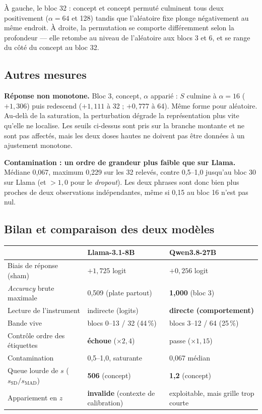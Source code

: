 \documentclass[a4paper,10pt]{article}
\newcommand{\pc}[1]{#1\,\%}
\begin{document}
À gauche, le bloc 32 : concept et concept permuté culminent tous deux positivement
($\alpha = 64$ et 128) tandis que l'aléatoire fixe plonge négativement au même endroit. À droite, la
permutation se comporte différemment selon la profondeur --- elle retombe au niveau de l'aléatoire
aux blocs 3 et 6, et se range du côté du concept au bloc 32.

\subsection{Autres mesures}

\textbf{Réponse non monotone.} Bloc 3, concept, $\alpha$ apparié : $S$ culmine à $\alpha = 16$
($+1{,}306$) puis redescend ($+1{,}111$ à 32 ; $+0{,}777$ à 64). Même forme pour aléatoire. Au-delà
de la saturation, la perturbation dégrade la représentation plus vite qu'elle ne localise. Les seuils
ci-dessus sont pris sur la branche montante et ne sont pas affectés, mais les deux doses hautes ne
doivent pas être données à un ajustement monotone.

\textbf{Contamination : un ordre de grandeur plus faible que sur Llama.} Médiane 0,067, maximum 0,229
sur les 32 relevés, contre 0,5--1,0 jusqu'au bloc 30 sur Llama (et $>1{,}0$ pour le \emph{dropout}).
Les deux phrases sont donc bien plus proches de deux observations indépendantes, même si 0,15 au bloc
16 n'est pas nul.

\subsection{Bilan et comparaison des deux modèles}

\begin{center}\small
\begin{tabular}{lll}
\toprule
& Llama-3.1-8B & Qwen3.8-27B \\
\midrule
Biais de réponse (sham) & $+1{,}725$ logit & $+0{,}256$ logit \\
\emph{Accuracy} brute maximale & 0,509 (plate partout) & \textbf{1,000} (bloc 3) \\
Lecture de l'instrument & indirecte (logits) & \textbf{directe (comportement)} \\
Bande vive & blocs 0--13 / 32 (\pc{44}) & blocs 3--12 / 64 (\pc{25}) \\
Contrôle ordre des étiquettes & \textbf{échoue} ($\times 2{,}4$) & passe ($\times 1{,}15$) \\
Contamination & 0,5--1,0, saturante & 0,067 médian \\
Queue lourde de $s$ ($s_{\mathrm{SD}}/s_{\mathrm{MAD}}$) & \textbf{506} (concept) & \textbf{1,2} (concept) \\
Appariement en $z$ & \textbf{invalide} (contexte de calibration) & exploitable, mais grille trop courte \\
\bottomrule
\end{tabular}
\end{center}
\end{document}
